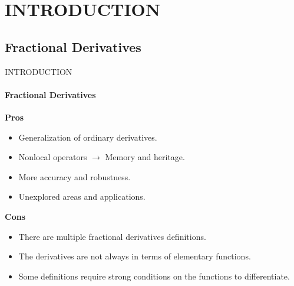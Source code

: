 
\section{INTRODUCTION}
\subsection{Fractional Derivatives}
\begin{frame}{INTRODUCTION}
\framesubtitle{Fractional Derivatives}
\begin{multicols}{2}
    \textbf{Pros}
    \begin{itemize}
        \item Generalization of ordinary derivatives.
        \item Nonlocal operators $\longrightarrow$ Memory and heritage.
        \item More accuracy and robustness.
        \item Unexplored areas and applications.
    \end{itemize}
    \columnbreak
    \textbf{Cons}
    \begin{itemize}
        \item There are multiple fractional derivatives definitions.
        \item The derivatives are not always in terms of elementary functions.
        \item Some definitions require strong conditions on the functions to differentiate.
    \end{itemize}
    \end{multicols}
\end{frame}

